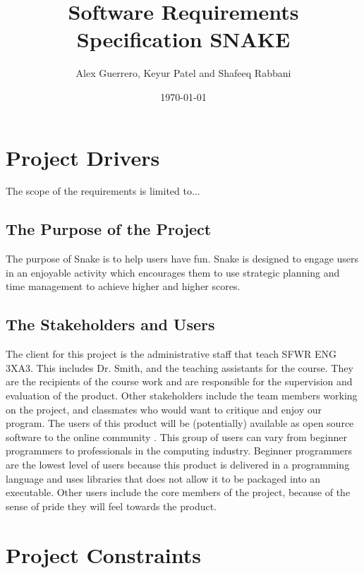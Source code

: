 \documentclass[12pt]{article}
\begin{document}
\title{Software Requirements Specification
SNAKE
} 
\author{Alex Guerrero, Keyur Patel and Shafeeq Rabbani}
\date{\today}
	
\maketitle

\tableofcontents

\section{Project Drivers}

The scope of the requirements is limited to...

\subsection{The Purpose of the Project}

		The purpose of Snake is to help users have fun. Snake is designed to engage users in an enjoyable activity which encourages them to use strategic planning and time management to achieve higher and higher scores.
		
\subsection{The Stakeholders and Users} 

The client for this project is the administrative staff that teach SFWR ENG 3XA3. This includes Dr. Smith, and the teaching assistants for the course. They are the recipients of the course work and are responsible for the supervision and evaluation of the product. Other stakeholders include the team members working on the project, and classmates who would want to critique and enjoy our program. The users of this product will be (potentially) available as open source software to the online community . This group of users can vary from beginner programmers to professionals in the computing industry. Beginner programmers are the lowest level of users because this product is delivered in a programming language and uses libraries that does not allow it to be packaged into an executable. Other users include the core members of the project, because of the sense of pride they will feel towards the product.

\section{Project Constraints}
\end{document}
